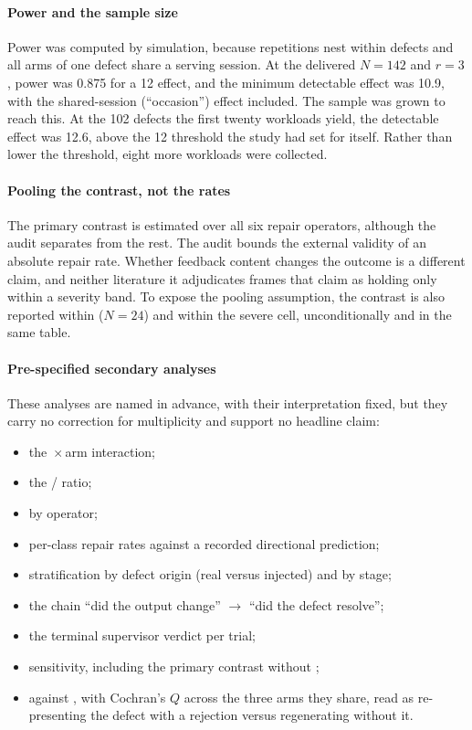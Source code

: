 \paragraph{Power and the sample size}
Power was computed by simulation, because repetitions nest within defects and
all arms of one defect share a serving session. At the delivered $N=142$ and
$r=3$, power was 0.875 for a 12\pp{} effect, and the minimum detectable effect
was 10.9\pp{}, with the shared-session (``occasion'') effect included. The
sample was grown to reach this. At the 102 defects the first twenty workloads
yield, the detectable effect was 12.6\pp{}, above the 12\pp{} threshold the
study had set for itself. Rather than lower the threshold, eight more workloads
were collected.

\paragraph{Pooling the contrast, not the rates}
The primary contrast is estimated over all six repair operators, although the
audit separates  from the rest. The audit bounds the external validity
of an absolute repair rate. Whether feedback content changes the outcome is a
different claim, and neither literature it adjudicates frames that claim as
holding only within a severity band. To expose the pooling assumption, the
contrast is also reported within  ($N=24$) and within the severe cell,
unconditionally and in the same table.

\paragraph{Pre-specified secondary analyses}
These analyses are named in advance, with their interpretation fixed, but they
carry no correction for multiplicity and support no headline claim:
\begin{itemize}
\item the \,$\times$\,arm interaction;
\item the / ratio;
\item {} by operator;
\item per-class repair rates against a recorded directional prediction;
\item stratification by defect origin (real versus injected) and by stage;
\item the chain ``did the output change'' $\rightarrow$ ``did the defect
  resolve'';
\item the terminal supervisor verdict per trial;
\item {} sensitivity, including the primary contrast without ;
\item {} against , with Cochran's $Q$ across the three arms they
  share, read as re-presenting the defect with a rejection versus regenerating
  without it.
\end{itemize}


